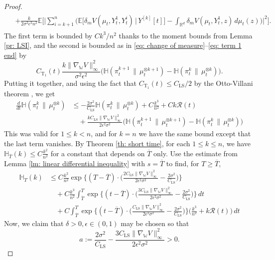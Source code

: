 \documentclass[11pt,reqno]{amsart}
\numberwithin{equation}{section}
\theoremstyle{definition}
\def\E{{\mathbb E}}
\def\R{{\mathbb R}}
\newcommand{\wgrad}{\nabla_{\W}}
\newcommand{\W}{\mathbb W}
\newcommand{\ent}{ \mathbb H}
\begin{document}
\begin{proof}
\begin{align}
\begin{split}
    &+  \frac{k}{2\sigma^2\epsilon^2 n^2}\E\bigg[\bigg | \sum_{i=k+1}^n\bigg(\E\Big[ \delta_m V(\mu_t, Y_t^1,Y_t^{i})\,\Big\vert\, Y^{[k]}[t]\Big]-\int_{\R^d}\delta_m V(\mu_t,Y_t^1,z)\,d\mu_t(z)\bigg)\bigg |^2\bigg].
\end{split}
\end{align}
The first term is bounded by $Ck^3/n^2$ thanks to the moment bounds from Lemma \ref{pr: LSI}, and the second is bounded as in \eqref{eq: change of measure}--\eqref{eq: term 1 end} by
\[
C_{\text{T}_1}(t)\frac{k\|\wgrad V\|_\infty^2}{\sigma^2\epsilon^2 }\bigg(\ent(\pi^{k+1}_t\,\|\,\mu^{\otimes k+1}_t)-\ent(\pi^k_t\,\|\,\mu^{\otimes k}_t)\bigg).
\]
Putting it together, and using the fact that $C_{\text{T}_1}(t)\leq  C_{\text{LS}}/2$ by the Otto-Villani theorem \cite{OttoVillaniLSITalagrand}, we get
    \begin{align*}
        \frac{d}{dt}\ent(\pi^k_t\,\|\,\mu^{\otimes k}_t)&\leq-\frac{2\sigma^2}{C_{\text{LS}}} \ent(\pi^k_t\,\|\,\mu^{\otimes k}_t) + C\frac{k^3}{n^2} + Ck\mathcal R(t) \\
        &\quad+\frac{kC_{\text{LS}}\|\wgrad V\|_\infty^2}{2\epsilon^2\sigma^2}\bigg(\ent(\pi^{k+1}_t\,\|\,\mu^{\otimes k+1}_t)-\ent(\pi^k_t\,\|\,\mu^{\otimes k}_t)\bigg)
    \end{align*}
    This was valid for $1\le k < n$, and for $k=n$ we have the same bound except that the last term vanishes.
By Theorem \ref{th: short time}, for each $1 \le k \le n$, we have $\ent_{\overline T}(k)\leq C\frac{k^2}{n^2}$ for a constant that depends on $\overline T$ only. 
Use the estimate from Lemma \ref{lm: linear differential inequality} with $s=\overline{T}$ to find, for $T \ge \overline{T}$,
\begin{align*}
    \ent_T(k)&\leq  C\frac{k^2}{n^2} \exp\Big\{(T-\overline T)\cdot \big(\frac{2C_{\text{LS}}\|\wgrad V\|_\infty^2}{2\epsilon^2\sigma^2}-\frac{2\sigma^2}{ C_{\text{LS}}}\big)\Big\} \\
    &\quad+C\frac{k^3}{n^2}\int_{\overline{T}}^T\exp\Big\{(t-\overline T)\cdot \big(\frac{3C_{\text{LS}}\|\wgrad V\|_\infty^2}{2\epsilon^2\sigma^2}-\frac{2\sigma^2}{ C_{\text{LS}}}\big)\Big\} \,dt\\
    &\quad +C\int_{\overline T}^T \exp\Big\{(t-\overline T)\cdot \big(\frac{C_{\text{LS}}\|\wgrad V\|_\infty^2}{2\epsilon^2\sigma^2}-\frac{2\sigma^2}{ C_{\text{LS}}}\big)\Big\}\Big(\frac{k^3}{n^2}+k \mathcal R(t)\Big)\,dt
\end{align*}
Now, we claim that  $\delta>0, \epsilon \in (0,1)$ may be chosen so that
\[
a := \frac{2\sigma^2}{ C_{\text{LS}}} - \frac{3C_{\text{LS}}\|\wgrad V\|_\infty^2}{2\epsilon^2\sigma^2} > 0.
\]
\end{proof}
\end{document}
